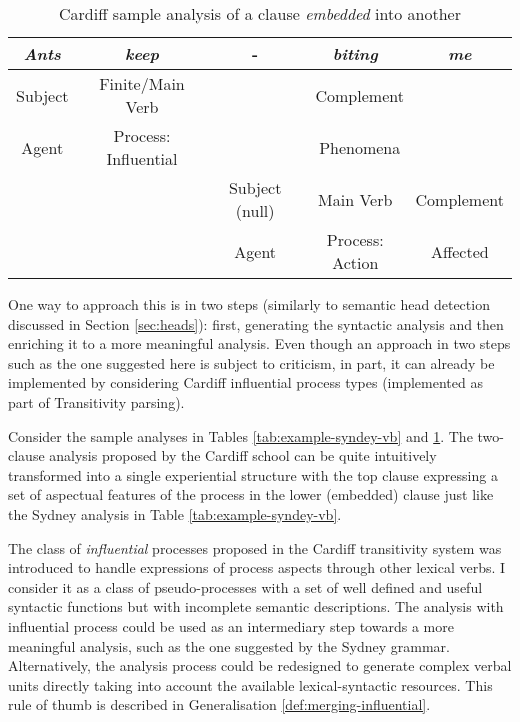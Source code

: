     \begin{table}[!ht]
    	\centering
    	\begin{tabular}{|c|c|c|c|c|}
    		\hline
    		{\it Ants} & {\it keep}          & -             & {\it biting}    & {\it me}   \\ \hline
    		Subject    & Finite/Main Verb           & \multicolumn{3}{c|}{Complement}              \\ \hline
    		Agent      & Process: Influential & \multicolumn{3}{c|}{Phenomena}               \\ \hline
    		\multicolumn{2}{|c|}{}           & Subject (null) & Main Verb       & Complement \\ \hline
    		\multicolumn{2}{|c|}{}           & Agent         & Process: Action & Affected   \\ \hline
    	\end{tabular}
    	\caption{Cardiff sample analysis of a clause \textit{embedded} into another}
    	\label{tab:example-cardiff-vb}
    \end{table}

    One way to approach this is in two steps (similarly to semantic head detection discussed in Section \ref{sec:heads}): first, generating the syntactic analysis and then enriching it to a more meaningful analysis. Even though an approach in two steps such as the one suggested here is subject to criticism, in part, it can already be implemented by considering Cardiff influential process types (implemented as part of Transitivity parsing).
    
    Consider the sample analyses in Tables \ref{tab:example-syndey-vb} and \ref{tab:example-cardiff-vb}. The two-clause analysis proposed by the Cardiff school can be quite intuitively transformed into a single experiential structure with the top clause expressing a set of aspectual features of the process in the lower (embedded) clause just like the Sydney analysis in Table \ref{tab:example-syndey-vb}. 

    The class of \textit{influential} processes proposed in the Cardiff transitivity system was introduced to handle expressions of process aspects through other lexical verbs. I consider it as a class of pseudo-processes with a set of well defined and useful syntactic functions but with incomplete semantic descriptions. The analysis with influential process could be used as an intermediary step towards a more meaningful analysis, such as the one suggested by the Sydney grammar. Alternatively, the analysis process could be redesigned to generate complex verbal units directly taking into account the available lexical-syntactic resources. This rule of thumb is described in Generalisation \ref{def:merging-influential}.


